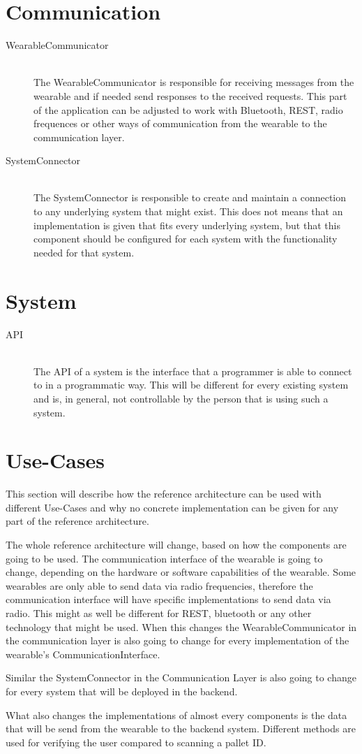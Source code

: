 \documentclass{report}
\begin{document}
\section{Communication}
\begin{description}
	\item[WearableCommunicator] \hfill \\
	The WearableCommunicator is responsible for receiving messages from the wearable and if needed send responses to the received requests. This part of the application can be adjusted to work with Bluetooth, REST, radio frequences or other ways of communication from the wearable to the communication layer.	
	\item[SystemConnector] \hfill \\
	The SystemConnector is responsible to create and maintain a connection to any underlying system that might exist. This does not means that an implementation is given that fits every underlying system, but that this component should be configured for each system with the functionality needed for that system.
\end{description}
\section{System}
\begin{description}
	\item[API] \hfill \\
	The API of a system is the interface that a programmer is able to connect to in a programmatic way. This will be different for every existing system and is, in general, not controllable by the person that is using such a system. 
\end{description}


\section{Use-Cases}
This section will describe how the reference architecture can be used with different Use-Cases and why no concrete implementation can be given for any part of the reference architecture.

The whole reference architecture will change, based on how the components are going to be used. The communication interface of the wearable is going to change, depending on the hardware or software capabilities of the wearable. Some wearables are only able to send data via radio frequencies, therefore the communication interface will have specific implementations to send data via radio. This might as well be different for REST, bluetooth or any other technology that might be used. When this changes the WearableCommunicator in the communication layer is also going to change for every implementation of the wearable's CommunicationInterface.

Similar the SystemConnector in the Communication Layer is also going to change for every system that will be deployed in the backend.

What also changes the implementations of almost every components is the data that will be send from the wearable to the backend system. Different methods are used for verifying the user compared to scanning a pallet ID. 
\end{document}
